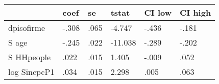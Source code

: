 \begin{table}[htbp]
\begin{tabular}{llllll} \hline \hline
 & coef  & se  & tstat  & CI low  & CI high  \\  \hline 
dpisofirme & -.308 & .065 & -4.747 & -.436 & -.181 \\  
S age & -.245 & .022 & -11.038 & -.289 & -.202 \\  
S HHpeople & .022 & .015 & 1.405 & -.009 & .052 \\  
log SincpcP1 & .034 & .015 & 2.298 & .005 & .063 \\  
\hline \hline \end{tabular}
\end{table}

